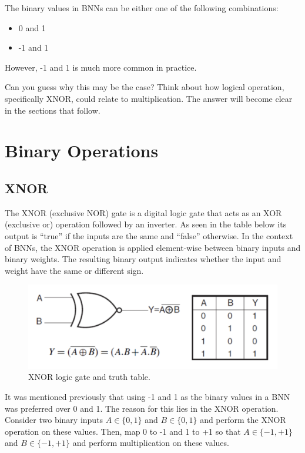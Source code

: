 The binary values in BNNs can be either one of the following combinations:
\begin{itemize}
    \item 0 and 1
    \item -1 and 1
\end{itemize}

However, -1 and 1 is much more common in practice.

\begin{exercise}
Can you guess why this may be the case? Think about how logical operation, specifically XNOR, could relate to multiplication. The answer will become clear in the sections that follow.
\end{exercise} 


\section{Binary Operations}
\subsection{XNOR}
The XNOR (exclusive NOR) gate is a digital logic gate that acts as an XOR (exclusive or) operation followed by an inverter. As seen in the table below its output is “true” if the inputs are the same and “false” otherwise. In the context of BNNs, the XNOR operation is applied element-wise between binary inputs and binary weights. The resulting binary output indicates whether the input and weight have the same or different sign. \\ 

\begin{figure}[htbp]
\centerline{\includegraphics[scale = .65]{images/xnor.png}}
\caption{XNOR logic gate and truth table.}
\label{fig:xnor}
\end{figure}

\newpage

It was mentioned previously that using -1 and 1 as the binary values in a BNN was preferred over 0 and 1. The reason for this lies in the XNOR operation. Consider two binary inputs $A \in \{0,1\}$ and $B \in \{0,1\}$ and perform the XNOR operation on these values. Then, map 0 to -1 and 1 to +1 so that $A \in \{-1,+1\}$ and $B \in \{-1,+1\}$ and perform multiplication on these values.

